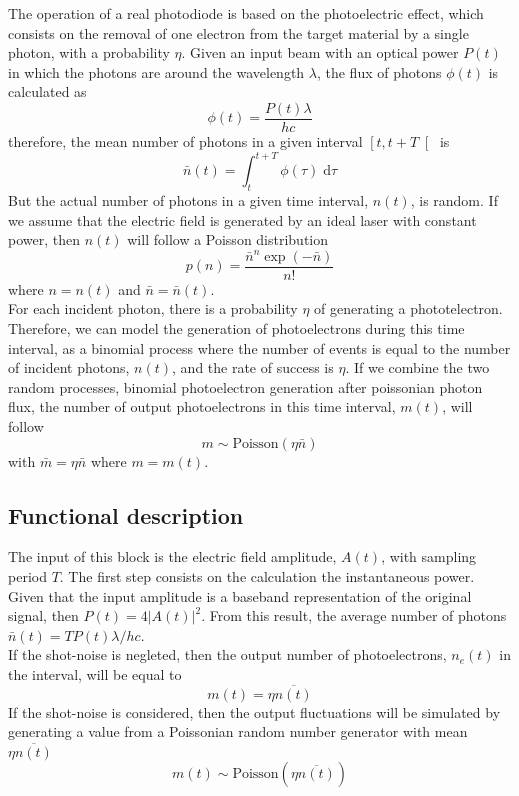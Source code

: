 \begin{refsection}
The operation of a real photodiode is based on the photoelectric effect, which consists on the removal of one electron from the target material by a single photon, with a probability $\eta$.
Given an input beam with an optical power $P(t)$ in which the photons are around the wavelength $\lambda$, the flux of photons $\phi(t)$ is calculated as
\cite{saleh1991}
%
\begin{equation}
	\phi(t) = \frac{P(t) \lambda}{hc}
\end{equation}
therefore, the mean number of photons in a given interval $\left[ t, t+T \right[$ is
\begin{equation}
	\bar{n}(t) = \int_{t}^{t+T} \phi(\tau) \; \textrm{d}\tau
\end{equation}
%
But the actual number of photons in a given time interval, $n(t)$, is random. If we assume that the electric field is generated by an ideal laser with constant power, then $n(t)$ will follow a Poisson distribution
%
\begin{equation}
	p\left( n \right) = \frac{ \bar{n}^n \exp(-\bar{n})}{n!}
\end{equation}
%
where $n=n(t)$ and $\bar{n} = \bar{n}(t)$.
\\
For each incident photon, there is a probability $\eta$ of generating a phototelectron.
Therefore, we can model the generation of photoelectrons during this time interval, as a binomial process where the number of events is equal to the number of incident photons, $n(t)$, and the rate of success is $\eta$.
If we combine the two random processes, binomial photoelectron generation after poissonian photon flux, the number of output photoelectrons in this time interval, $m(t)$, will follow
\cite{saleh1991}
%
\begin{equation}
	m \sim \textrm{Poisson}\left(\eta \bar{n} \right)
	\label{eq:electron_number_distribution}
\end{equation}
%
with $\bar{m} = \eta \bar{n}$ where $m = m(t)$.
%
%
%
%
\subsection*{Functional description}
%
The input of this block is the electric field amplitude, $A(t)$, with sampling period $T$.
The first step consists on the calculation the instantaneous power.
Given that the input amplitude is a baseband representation of the original signal, then $P(t) = 4 |A(t)|^2$.
From this result, the average number of photons $\bar{n}(t) = T P(t) \lambda / h c$.\\
If the shot-noise is negleted, then the output number of photoelectrons, $n_e(t)$ in the interval, will be equal to
%
\begin{equation}
	m(t) = \eta \overline{n(t)}
\end{equation}
%
If the shot-noise is considered, then the output fluctuations will be simulated by generating a value from a Poissonian random number generator with mean $\eta \overline{n(t)}$
\begin{equation}
	m(t) \sim \textrm{Poisson}\left(\eta \overline{n(t)} \right)
\end{equation}


\end{refsection}
